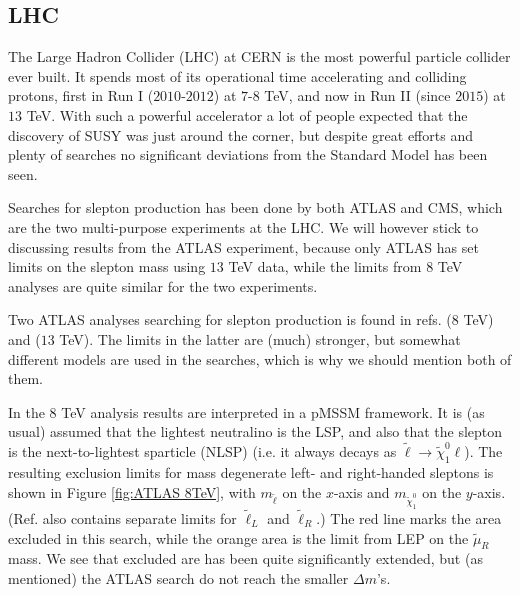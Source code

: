 \documentclass[twocolumn,a4paper,10pt]{article}
\begin{document}
\subsection{LHC}

The Large Hadron Collider (LHC) at CERN is the most powerful particle collider ever built. It  
spends most of its operational time accelerating and colliding protons, first in Run I ($2010$-$2012$) 
at $7$-$8$ TeV, and now in Run II (since $2015$) at $13$ TeV. With such a powerful accelerator a lot 
of people expected that the discovery of SUSY was just around the corner, but despite great efforts 
and plenty of searches no significant deviations from the Standard Model has been seen.

Searches for slepton production has been done by both ATLAS and CMS, which are the two multi-purpose 
experiments at the LHC. We will however stick to discussing results from the ATLAS experiment, because 
only ATLAS has set limits on the slepton mass using $13$ TeV data, while the limits from $8$ TeV analyses 
are quite similar for the two experiments. 

Two ATLAS analyses searching for slepton production is found in refs. \cite{ATLAS:2014} ($8$ TeV) and 
\cite{ATLAS:2017} ($13$ TeV). The limits in the latter are (much) stronger, but somewhat different 
models are used in the searches, which is why we should mention both of them.

In the $8$ TeV analysis results are interpreted in a pMSSM framework. It is (as usual) assumed that 
the lightest neutralino is the LSP, and also that the slepton is the next-to-lightest sparticle (NLSP) 
(i.e. it always decays as $\tilde{\ell}\rightarrow \tilde{\chi}_1^0 \ell$). The resulting exclusion 
limits for mass degenerate left- and right-handed sleptons is shown in Figure \ref{fig:ATLAS 8TeV}, 
with $m_{\tilde{\ell}}$ on the $x$-axis and $m_{\tilde{\chi}_1^0}$ on the $y$-axis.  
(Ref. \cite{ATLAS:2014} also contains separate limits for $\tilde{\ell}_L$ and $\tilde{\ell}_R$.)   
The red line marks the area excluded in this search, while the orange area is the limit from 
LEP on the $\tilde{\mu}_R$ mass. We see that excluded are has been quite significantly extended, but 
(as mentioned) the ATLAS search do not reach the smaller $\Delta m$'s.
\end{document}
